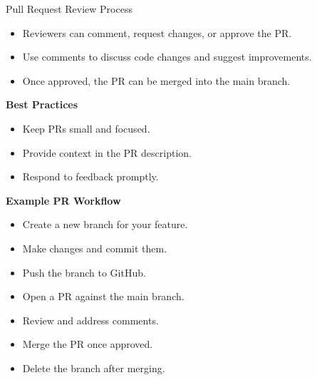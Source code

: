 \documentclass[12pt]{beamer}
\begin{document}
\begin{frame}{Pull Request Review Process}
  \begin{itemize}
    \item Reviewers can comment, request changes, or approve the PR.
    \item Use comments to discuss code changes and suggest improvements.
    \item Once approved, the PR can be merged into the main branch.
  \end{itemize}
  \pause
  \textbf{Best Practices}
  \begin{itemize}
    \item Keep PRs small and focused.
    \item Provide context in the PR description.
    \item Respond to feedback promptly.
  \end{itemize}  
\end{frame}

\begin{frame}
  \textbf{Example PR Workflow}

  \begin{itemize}
    \item Create a new branch for your feature.
    \item Make changes and commit them.
    \item Push the branch to GitHub.
    \item Open a PR against the main branch.
    \item Review and address comments.
    \item Merge the PR once approved.
    \item Delete the branch after merging.
  \end{itemize}
\end{frame}
\end{document}
